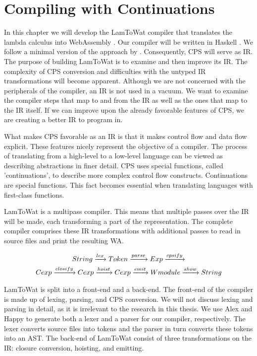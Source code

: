 
\chapter{\label{chap:cpscomp}Compiling with Continuations}
In this chapter we will develop the LamToWat compiler that translates the lambda calculus into WebAssembly \autocite{webassemblyhomepage}. Our compiler will be written in Haskell \autocite{haskellhomepage}. We follow a minimal version of the approach by \citeauthor{DBLP:books/daglib/0022396}. Consequently, \ac{CPS} will serve as \ac{IR}. The purpose of building LamToWat is to examine and then improve its \ac{IR}. The complexity of \ac{CPS} conversion and difficulties with the untyped \ac{IR} transformations will become apparent. Although we are not concerned with the peripherals of the compiler, an \ac{IR} is not used in a vacuum. We want to examine the compiler steps that map to and from the \ac{IR} as well as the ones that map to the \ac{IR} itself. If we can improve upon the already favorable features of \ac{CPS}, we are creating a better IR to program in.

What makes \ac{CPS} favorable as an \ac{IR} is that it makes control flow and data flow explicit. These features nicely represent the objective of a compiler. The process of translating from a high-level to a low-level language can be viewed as describing abstractions in finer detail. \ac{CPS} uses special functions, called 'continuations', to describe more complex control flow constructs. Continuations are special functions. This fact becomes essential when translating languages with first-class functions.

LamToWat is a multipass compiler. This means that multiple passes over the \ac{IR} will be made, each transforming a part of the representation. The complete compiler comprises these \ac{IR} transformations with additional passes to read in source files and print the resulting \ac{WA}.

\begin{gather*}
  String \xrightarrow{lex} Token \xrightarrow{parse} Exp \xrightarrow{cpsify}\\
  Cexp \xrightarrow{closify} Cexp \xrightarrow{hoist} Cexp \xrightarrow{emit} Wmodule \xrightarrow{show} String
\end{gather*}

LamToWat is split into a front-end and a back-end. The front-end of the compiler is made up of lexing, parsing, and \ac{CPS} conversion. We will not discuss lexing and parsing in detail, as it is irrelevant to the research in this thesis. We use Alex \autocite{haskellalex} and Happy \autocite{haskellhappy} to generate both a lexer and a parser for our compiler, respectively. The lexer converts source files into tokens and the parser in turn converts these tokens into an \ac{AST}. The back-end of LamToWat consist of three transformations on the \ac{IR}: closure conversion, hoisting, and emitting.

